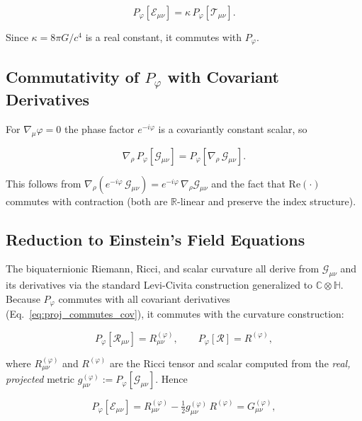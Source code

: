\begin{equation}
\label{eq:proj_both_sides}
P_\varphi[\mathcal{E}_{\mu\nu}] = \kappa\,P_\varphi[\mathcal{T}_{\mu\nu}].
\end{equation}

Since $\kappa = 8\pi G/c^4$ is a real constant, it commutes with $P_\varphi$.

\subsection{Commutativity of $P_\varphi$ with Covariant Derivatives}

For $\nabla_\mu\varphi = 0$ the phase factor $e^{-i\varphi}$ is a covariantly constant scalar, so

\begin{equation}
\label{eq:proj_commutes_cov}
\nabla_\rho\,P_\varphi[\mathcal{G}_{\mu\nu}] = P_\varphi[\nabla_\rho\,\mathcal{G}_{\mu\nu}].
\end{equation}

This follows from $\nabla_\rho(e^{-i\varphi}\,\mathcal{G}_{\mu\nu}) = e^{-i\varphi}\,\nabla_\rho\mathcal{G}_{\mu\nu}$
and the fact that $\mathrm{Re}(\cdot)$ commutes with contraction (both are $\mathbb{R}$-linear and
preserve the index structure).

\subsection{Reduction to Einstein's Field Equations}

The biquaternionic Riemann, Ricci, and scalar curvature all derive from $\mathcal{G}_{\mu\nu}$ and its
derivatives via the standard Levi-Civita construction generalized to $\mathbb{C}\otimes\mathbb{H}$.
Because $P_\varphi$ commutes with all covariant derivatives (Eq.~\eqref{eq:proj_commutes_cov}), it
commutes with the curvature construction:

\begin{equation}
P_\varphi[\mathcal{R}_{\mu\nu}] = R_{\mu\nu}^{(\varphi)},\qquad
P_\varphi[\mathcal{R}] = R^{(\varphi)},
\end{equation}

where $R_{\mu\nu}^{(\varphi)}$ and $R^{(\varphi)}$ are the Ricci tensor and scalar computed from the
\emph{real, projected} metric $g_{\mu\nu}^{(\varphi)} := P_\varphi[\mathcal{G}_{\mu\nu}]$.  Hence

\begin{equation}
P_\varphi[\mathcal{E}_{\mu\nu}]
= R_{\mu\nu}^{(\varphi)} - \tfrac{1}{2}g_{\mu\nu}^{(\varphi)}\,R^{(\varphi)}
= G_{\mu\nu}^{(\varphi)},
\end{equation}

